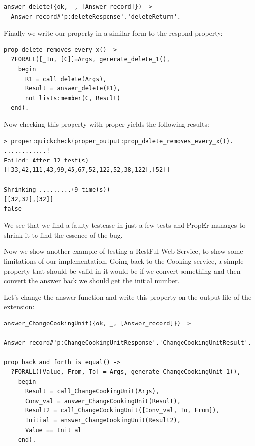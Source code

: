 \documentclass[submission,copyright,a4]{eptcs}
\begin{document}
\begin{lstlisting}
answer_delete({ok, _, [Answer_record]}) ->
  Answer_record#'p:deleteResponse'.'deleteReturn'.
\end{lstlisting}

Finally we write our property in a similar form to the respond property:

\begin{lstlisting}
prop_delete_removes_every_x() ->
  ?FORALL([_In, [C]]=Args, generate_delete_1(),
    begin
      R1 = call_delete(Args),
      Result = answer_delete(R1),
      not lists:member(C, Result)
  end).
\end{lstlisting}


Now checking this property with proper yields the following results:

\begin{lstlisting}
> proper:quickcheck(proper_output:prop_delete_removes_every_x()).
............!
Failed: After 12 test(s).
[[33,42,111,43,99,45,67,52,122,52,38,122],[52]]

Shrinking .........(9 time(s))
[[32,32],[32]]
false
\end{lstlisting}

We see that we find a faulty testcase in just a few tests and PropEr manages to shrink it to find the essence of the bug.

Now we show another example of testing a RestFul Web Service, to show some limitations of our implementation. Going back to the Cooking service, a simple property that should be valid in it would be if we convert something and then convert the answer back we should get the initial number.

Let's change the answer function and write this property on the output file of the extension:

\begin{lstlisting}
answer_ChangeCookingUnit({ok, _, [Answer_record]}) -> 
  Answer_record#'p:ChangeCookingUnitResponse'.'ChangeCookingUnitResult'.

prop_back_and_forth_is_equal() ->
  ?FORALL([Value, From, To] = Args, generate_ChangeCookingUnit_1(),
    begin
      Result = call_ChangeCookingUnit(Args),
      Conv_val = answer_ChangeCookingUnit(Result),
      Result2 = call_ChangeCookingUnit([Conv_val, To, From]),
      Initial = answer_ChangeCookingUnit(Result2),
      Value == Initial
    end).
\end{lstlisting}
\end{document}
